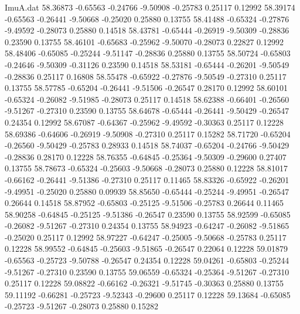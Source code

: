 \begin{filecontents}{ImuA.dat}
  58.36873   -0.65563   -0.24766   -9.50908   -0.25783    0.25117    0.12992
  58.39174   -0.65563   -0.26441   -9.50668   -0.25020    0.25880    0.13755
  58.41488   -0.65324   -0.27876   -9.49592   -0.28073    0.25880    0.14518
  58.43781   -0.65444   -0.26919   -9.50309   -0.28836    0.23590    0.13755
  58.46101   -0.65683   -0.25962   -9.50070   -0.28073    0.22827    0.12992
  58.48406   -0.65085   -0.25244   -9.51147   -0.28836    0.25880    0.13755
  58.50724   -0.65803   -0.24646   -9.50309   -0.31126    0.23590    0.14518
  58.53181   -0.65444   -0.26201   -9.50549   -0.28836    0.25117    0.16808
  58.55478   -0.65922   -0.27876   -9.50549   -0.27310    0.25117    0.13755
  58.57785   -0.65204   -0.26441   -9.51506   -0.26547    0.28170    0.12992
  58.60101   -0.65324   -0.26082   -9.51985   -0.28073    0.25117    0.14518
  58.62388   -0.66401   -0.26560   -9.51267   -0.27310    0.23590    0.13755
  58.64678   -0.65444   -0.26441   -9.50429   -0.26547    0.24354    0.12992
  58.67087   -0.64367   -0.25962   -9.49592   -0.30363    0.25117    0.12228
  58.69386   -0.64606   -0.26919   -9.50908   -0.27310    0.25117    0.15282
  58.71720   -0.65204   -0.26560   -9.50429   -0.25783    0.28933    0.14518
  58.74037   -0.65204   -0.24766   -9.50429   -0.28836    0.28170    0.12228
  58.76355   -0.64845   -0.25364   -9.50309   -0.29600    0.27407    0.13755
  58.78673   -0.65324   -0.25603   -9.50668   -0.28073    0.25880    0.12228
  58.81017   -0.66162   -0.26441   -9.51386   -0.27310    0.25117    0.11465
  58.83326   -0.65922   -0.26201   -9.49951   -0.25020    0.25880    0.09939
  58.85650   -0.65444   -0.25244   -9.49951   -0.26547    0.26644    0.14518
  58.87952   -0.65803   -0.25125   -9.51506   -0.25783    0.26644    0.11465
  58.90258   -0.64845   -0.25125   -9.51386   -0.26547    0.23590    0.13755
  58.92599   -0.65085   -0.26082   -9.51267   -0.27310    0.24354    0.13755
  58.94923   -0.64247   -0.26082   -9.51865   -0.25020    0.25117    0.12992
  58.97227   -0.64247   -0.25005   -9.50668   -0.25783    0.25117    0.12228
  58.99552   -0.64845   -0.25603   -9.51865   -0.26547    0.22064    0.12228
  59.01879   -0.65563   -0.25723   -9.50788   -0.26547    0.24354    0.12228
  59.04261   -0.65803   -0.25244   -9.51267   -0.27310    0.23590    0.13755
  59.06559   -0.65324   -0.25364   -9.51267   -0.27310    0.25117    0.12228
  59.08822   -0.66162   -0.26321   -9.51745   -0.30363    0.25880    0.13755
  59.11192   -0.66281   -0.25723   -9.52343   -0.29600    0.25117    0.12228
  59.13684   -0.65085   -0.25723   -9.51267   -0.28073    0.25880    0.15282

\end{filecontents}
